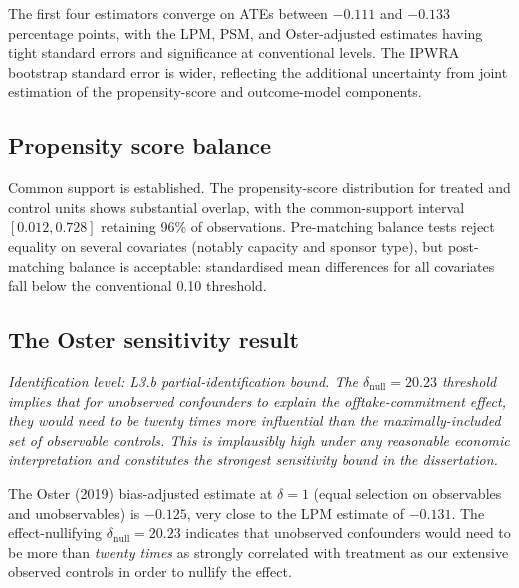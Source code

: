 The first four estimators converge on ATEs between $-0.111$ and $-0.133$ percentage points, with the LPM, PSM, and Oster-adjusted estimates having tight standard errors and significance at conventional levels. The IPWRA bootstrap standard error is wider, reflecting the additional uncertainty from joint estimation of the propensity-score and outcome-model components.

\subsection{Propensity score balance}

Common support is established. The propensity-score distribution for treated and control units shows substantial overlap, with the common-support interval $[0.012, 0.728]$ retaining 96\% of observations. Pre-matching balance tests reject equality on several covariates (notably capacity and sponsor type), but post-matching balance is acceptable: standardised mean differences for all covariates fall below the conventional 0.10 threshold.

\subsection{The Oster sensitivity result}
\noindent\emph{Identification level: L3.b partial-identification bound. The $\delta_{\text{null}} = 20.23$ threshold implies that for unobserved confounders to explain the offtake-commitment effect, they would need to be twenty times more influential than the maximally-included set of observable controls. This is implausibly high under any reasonable economic interpretation and constitutes the strongest sensitivity bound in the dissertation.}

\label{sec:offtake_sensitivity}

The Oster (2019) bias-adjusted estimate at $\delta = 1$ (equal selection on observables and unobservables) is $-0.125$, very close to the LPM estimate of $-0.131$. The effect-nullifying $\delta_{\text{null}} = 20.23$ indicates that unobserved confounders would need to be more than \emph{twenty times} as strongly correlated with treatment as our extensive observed controls in order to nullify the effect.

